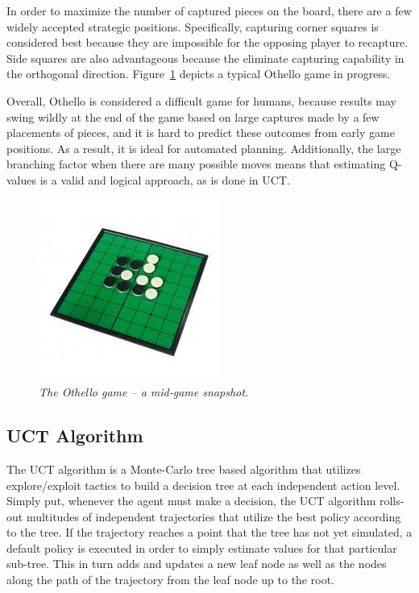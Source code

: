 \documentclass[12pt,letterpaper]{article}
\begin{document}
In order to maximize the number of captured pieces on the board, there are a few widely accepted strategic positions.  Specifically, capturing corner squares is considered best because they are impossible for the opposing player to recapture. Side squares are also advantageous because the eliminate capturing capability in the orthogonal direction. Figure~\ref{fig1} depicts a typical Othello game in progress.

Overall, Othello is considered a difficult game for humans, because results may swing wildly at the end of the game based on large captures made by a few placements of pieces, and it is hard to predict these outcomes from early game positions. As a result, it is ideal for automated planning. Additionally, the large branching factor when there are many possible moves means that estimating Q-values is a valid and logical approach, as is done in UCT.

\begin{figure}[!h]
\begin{center}
\includegraphics[scale=1]{othello_board}
\caption{\textit{The Othello game -- a mid-game snapshot.}}
\label{fig1}
\end{center}
\end{figure}

\pagebreak
\subsection{UCT Algorithm}
The UCT algorithm is a Monte-Carlo tree based algorithm that utilizes explore/exploit tactics to build a decision tree at each independent action level. Simply put, whenever the agent must make a decision, the UCT algorithm rolls-out multitudes of independent trajectories that utilize the best policy according to the tree. If the trajectory reaches a point that the tree has not yet simulated, a default policy is executed in order to simply estimate values for that particular sub-tree.  This in turn adds and updates a new leaf node as well as the nodes along the path of the trajectory from the leaf node up to the root.
\end{document}
